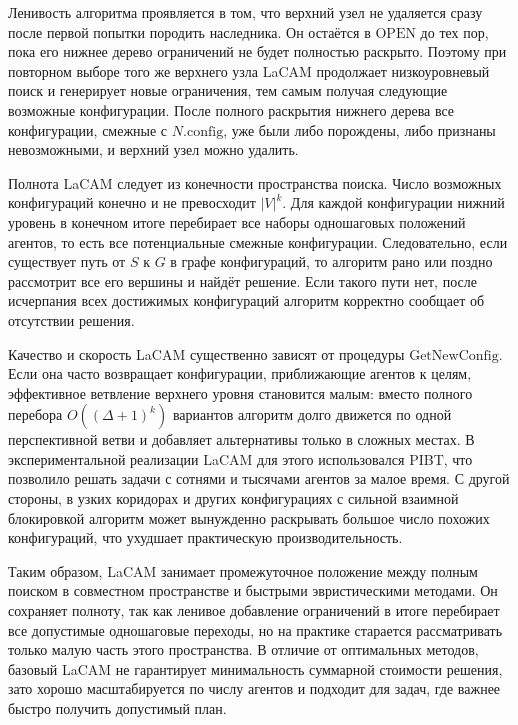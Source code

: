 Ленивость алгоритма проявляется в том, что верхний узел не удаляется сразу после первой попытки
породить наследника. Он остаётся в $\mathrm{OPEN}$ до тех пор, пока его нижнее дерево ограничений не
будет полностью раскрыто. Поэтому при повторном выборе того же верхнего узла LaCAM продолжает
низкоуровневый поиск и генерирует новые ограничения, тем самым получая следующие возможные
конфигурации. После полного раскрытия нижнего дерева все конфигурации, смежные с
$N.\mathrm{config}$, уже были либо порождены, либо признаны невозможными, и верхний узел можно удалить.

Полнота LaCAM следует из конечности пространства поиска. Число возможных конфигураций конечно и не
превосходит $|V|^k$. Для каждой конфигурации нижний уровень в конечном итоге перебирает все наборы
одношаговых положений агентов, то есть все потенциальные смежные конфигурации. Следовательно, если
существует путь от $S$ к $G$ в графе конфигураций, то алгоритм рано или поздно рассмотрит все его
вершины и найдёт решение. Если такого пути нет, после исчерпания всех достижимых конфигураций
алгоритм корректно сообщает об отсутствии решения.

Качество и скорость LaCAM существенно зависят от процедуры $\mathrm{GetNewConfig}$. Если она часто
возвращает конфигурации, приближающие агентов к целям, эффективное ветвление верхнего уровня становится
малым: вместо полного перебора $O((\Delta + 1)^k)$ вариантов алгоритм долго движется по одной
перспективной ветви и добавляет альтернативы только в сложных местах. В экспериментальной реализации
LaCAM для этого использовался PIBT, что позволило решать задачи с сотнями и тысячами агентов за малое
время. С другой стороны, в узких коридорах и других конфигурациях с сильной взаимной блокировкой
алгоритм может вынужденно раскрывать большое число похожих конфигураций, что ухудшает практическую
производительность.

Таким образом, LaCAM занимает промежуточное положение между полным поиском в совместном пространстве и
быстрыми эвристическими методами. Он сохраняет полноту, так как ленивое добавление ограничений в итоге
перебирает все допустимые одношаговые переходы, но на практике старается рассматривать только малую
часть этого пространства. В отличие от оптимальных методов, базовый LaCAM не гарантирует минимальность
суммарной стоимости решения, зато хорошо масштабируется по числу агентов и подходит для задач, где
важнее быстро получить допустимый план.
